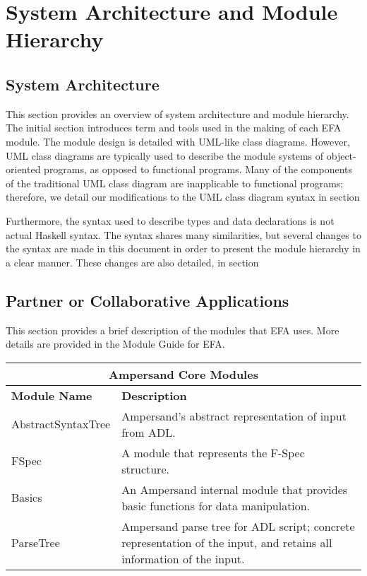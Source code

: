 \noindent
\section{System Architecture and Module Hierarchy}

\subsection{System Architecture}\label{SystemArch}
This section provides an overview of system architecture and module hierarchy. 
The 
initial section introduces term and tools used in the making of each EFA 
module. The module design is detailed with UML-like class diagrams. However, 
UML class diagrams are typically
used to describe the module systems of object-oriented programs, as opposed to
functional programs. Many of the components of the traditional UML class
diagram are inapplicable to functional programs; therefore, we detail our
modifications to the UML class diagram syntax in 
section%

Furthermore, the syntax used to describe types and data declarations is not
actual Haskell syntax. The syntax shares many similarities, but several changes
to the syntax are made in this document in order to present the module hierarchy
in a clear manner. These changes are also detailed, in 
section%

\subsection{Partner or Collaborative Applications}\label{subsec:Collaborative}
This section provides a brief description of the modules that EFA uses. More 
details are provided in the Module Guide for EFA.

\begin{adjustbox}{center}
    \begin{tabular}{ |p{3.2cm}|p{11cm}|  }
        \hline
        \multicolumn{2}{|c|}{\bfseries{\large{Ampersand Core Modules}}} \\ 
        \hline\hline
        \bfseries{Module Name} & \bfseries{Description}\\
        \hline
        AbstractSyntaxTree   & Ampersand's abstract representation of input 
        from 
        ADL.   \\
        \hline
        FSpec &   A module that represents the F-Spec structure.\\
        \hline
        Basics & An Ampersand internal module that provides basic functions for 
        data manipulation.\\
        \hline
        ParseTree    & Ampersand parse tree for ADL script; concrete 
        representation 
        of the input, and retains all information of the input. \\
        \hline
    \end{tabular}
\end{adjustbox}


